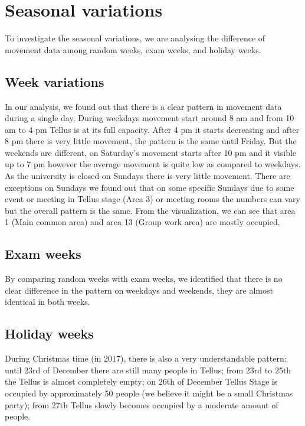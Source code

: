 \documentclass{article}
\begin{document}
\section{Seasonal variations}

To investigate the seasonal variations, we are analysing the difference of movement data among
random weeks, exam weeks, and holiday weeks.

\subsection{Week variations}

In our analysis, we found out that there is a clear pattern in movement data during a single day.
During weekdays movement start around 8 am and from 10 am to 4 pm Tellus is at its full capacity.
After 4 pm it starts decreasing and after 8 pm there is very little movement, the pattern is the
same until Friday. But the weekends are different, on Saturday’s movement starts after 10 pm and it
visible up to 7 pm however the average movement is quite low as compared to weekdays. As the
university is closed on Sundays there is very little movement. There are exceptions on Sundays we
found out that on some specific Sundays due to some event or meeting in Tellus stage (Area 3) or
meeting rooms the numbers can vary but the overall pattern is the same. From the visualization, we
can see that area 1 (Main common area) and area 13 (Group work area) are mostly occupied.

\subsection{Exam weeks}

By comparing random weeks with exam weeks, we identified that there is no clear difference in the
pattern on  weekdays and weekends, they are almost identical in both weeks.

\subsection{Holiday weeks}

During Christmas time (in 2017), there is also a very understandable pattern: until 23rd of December
there are still many people in Tellus; from 23rd to 25th the Tellus is almost completely empty; on
26th of December Tellus Stage is occupied by approximately 50 people (we believe it might be a small
Christmas party); from 27th Tellus slowly becomes occupied by a moderate amount of people.
\end{document}

